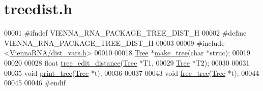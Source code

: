 \hypertarget{treedist_8h_source}{}\section{treedist.\+h}
\label{treedist_8h_source}

\begin{DoxyCode}
00001 \textcolor{preprocessor}{#ifndef VIENNA\_RNA\_PACKAGE\_TREE\_DIST\_H}
00002 \textcolor{preprocessor}{#define VIENNA\_RNA\_PACKAGE\_TREE\_DIST\_H}
00003 
00009 \textcolor{preprocessor}{#include <\hyperlink{dist__vars_8h}{ViennaRNA/dist\_vars.h}>}
00010 
00018 \hyperlink{structTree}{Tree} *\hyperlink{treedist_8h_a08fe4d5afd385dce593b86eaf010c6e3}{make\_tree}(\textcolor{keywordtype}{char} *struc);
00019 
00020 
00028 \textcolor{keywordtype}{float}   \hyperlink{treedist_8h_a3b21f1925f7071f46d93431a835217bb}{tree\_edit\_distance}(\hyperlink{structTree}{Tree} *T1,
00029                            \hyperlink{structTree}{Tree} *T2);
00030 
00031 
00035 \textcolor{keywordtype}{void}    \hyperlink{treedist_8h_a21ad4de3ba4055aeef08b28c9ad48894}{print\_tree}(\hyperlink{structTree}{Tree} *t);
00036 
00037 
00043 \textcolor{keywordtype}{void}    \hyperlink{treedist_8h_acbc1cb9bce582ea945e4a467c76a57aa}{free\_tree}(\hyperlink{structTree}{Tree} *t);
00044 
00045 
00046 \textcolor{preprocessor}{#endif}
\end{DoxyCode}
